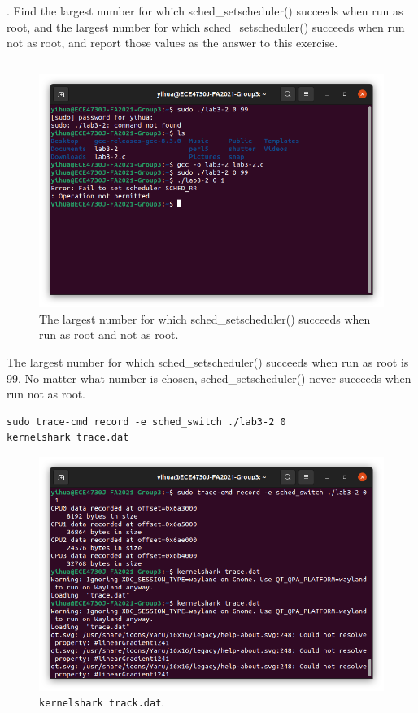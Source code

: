 \documentclass[a4paper]{article}
\begin{document}
. Find the largest number for which sched\_setscheduler() succeeds when run as root, and the largest number for which sched\_setscheduler() succeeds when run not as root, and report those values as the answer to this exercise.
\inputminted[frame=single,bgcolor=bg,breaklines,linenos]{c}{lab3-2.c}
\begin{figure}[H]
    \centering
    \includegraphics[width=1\textwidth]{4.png}
    \caption{The largest number for which sched\_setscheduler() succeeds when run as root and not as root.}
\end{figure}
The largest number for which sched\_setscheduler() succeeds when run as root is 99. No matter what number is chosen, sched\_setscheduler() never succeeds when run not as root.
\begin{verbatim}
sudo trace-cmd record -e sched_switch ./lab3-2 0
kernelshark trace.dat
\end{verbatim}
\begin{figure}[H]
    \centering
    \includegraphics[width=1\textwidth]{5.png}
    \caption{\texttt{kernelshark track.dat}.}
\end{figure}
\end{document}
